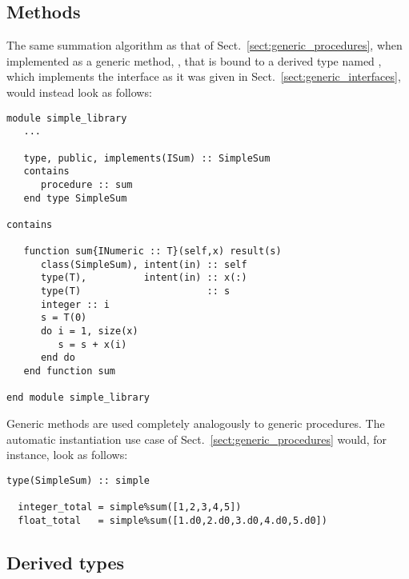 \documentclass[11pt,oneside]{report}
\newcommand{\code}[1]{{\selectfont\ttfamily{#1}}}
\begin{document}
\subsection{Methods}
\label{sect:generic_methods}

The same summation algorithm as that of
Sect.~\ref{sect:generic_procedures}, when implemented as a generic
method, \code{sum}, that is bound to a derived type named
\code{SimpleSum}, which implements the interface \code{ISum} as it was
given in Sect.~\ref{sect:generic_interfaces}, would instead look as
follows:
\begin{lstlisting}[language=LFortran,style=boxed]
module simple_library
   ...

   type, public, implements(ISum) :: SimpleSum
   contains
      procedure :: sum
   end type SimpleSum

contains
   
   function sum{INumeric :: T}(self,x) result(s)
      class(SimpleSum), intent(in) :: self
      type(T),          intent(in) :: x(:)
      type(T)                      :: s
      integer :: i
      s = T(0)
      do i = 1, size(x)
         s = s + x(i)
      end do
   end function sum

end module simple_library
\end{lstlisting}

Generic methods are used completely analogously to generic
procedures. The automatic instantiation use case of
Sect.~\ref{sect:generic_procedures} would, for instance, look as
follows:
\begin{lstlisting}[language=LFortran,style=boxed]
  type(SimpleSum) :: simple

  integer_total = simple%sum([1,2,3,4,5])
  float_total   = simple%sum([1.d0,2.d0,3.d0,4.d0,5.d0])
\end{lstlisting}

\subsection{Derived types}
\label{sect:generic_derived_types}
\end{document}
